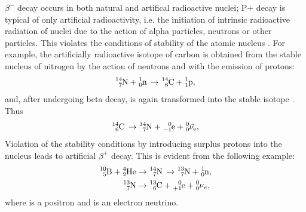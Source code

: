 $\beta^{-}$ decay occurs in both natural and artifical radioactive nuclei; P+ decay is typical of only artificial radioactivity, i.e. the initiation of intrinsic radioactive radiation of nuclei due to the action of alpha particles, neutrons or other particles. This violates the conditions of stability of the atomic nucleus . For example, the artificially radioactive isotope of carbon  is obtained from the stable nucleus of nitrogen by the action of neutrons and with the emission of protons:
\begin{equation*}%
\ce{^{14}_{7}N + ^{1}_{0}n \to  ^{14}_{6}C + ^{1}_{1}p},
\end{equation*}
and, after undergoing beta decay, is again transformed into
the stable isotope . Thus
\begin{equation*}%
\ce{^{14}_{6}C \to ^{14}_{7}N +  ^{0}_{-1}e + ^{0}_{0}\tilde{\nu_{e}}},
\end{equation*}
Violation of the stability conditions  by introducing surplus protons into the nucleus leads to artificial $\beta^{+}$ decay.
This is evident from the following example:
\begin{align*}%
\ce{^{10}_{5}B + ^{4}_{2}He 
& \to  ^{14}_{7}N \to ^{13}_{7}N + ^{1}_{0}n},\\
\ce{^{13}_{7}N & \to ^{13}_{6}C +  ^{0}_{+1}e + ^{0}_{0}\nu_{e}},
\end{align*}
where  is a positron and  is an electron neutrino.



